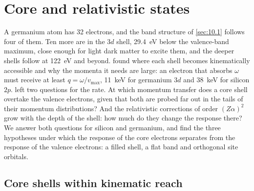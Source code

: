 \section{Core and relativistic states}\label{sec:10.6}

A germanium atom has 32 electrons, and the band structure of \cref{sec:10.1} follows four of them. Ten more are in the $3d$ shell, \SI{29.4}{eV} below the valence-band maximum, close enough for light dark matter to excite them, and the deeper shells follow at \SI{122}{eV} and beyond.  found where each shell becomes kinematically accessible and why the momenta it needs are large: an electron that absorbs $\omega$ must receive at least $q = \omega/v_{\mathrm{max}}$, \SI{11}{keV} for germanium $3d$ and \SI{38}{keV} for silicon $2p$.  left two questions for the rate. At which momentum transfer does a core shell overtake the valence electrons, given that both are probed far out in the tails of their momentum distributions? And the relativistic corrections of order $(Z\alpha)^2$ grow with the depth of the shell: how much do they change the response there? We answer both questions for silicon and germanium, and find the three hypotheses under which the response of the core electrons separates from the response of the valence electrons: a filled shell, a flat band and orthogonal site orbitals.

\subsection{Core shells within kinematic reach}\label{sec:10.6-reach}

